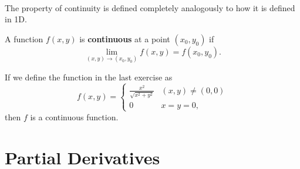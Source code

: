 \documentclass[../multivariate_calculus.tex]{subfiles}
\begin{document}
        \paragraph{}
        The property of continuity is defined completely analogously to how it is defined in 1D.
        \begin{definition}
            A function $f(x,y)$ is \textbf{continuous} at a point $(x_0,y_0)$ if
            \begin{equation}
                \lim_{(x,y)\to(x_0,y_0)}f(x,y)=f(x_0,y_0).
            \end{equation}
        \end{definition}
        \begin{example}
            If we define the function in the last exercise as
            \begin{equation}
                f(x,y)=\begin{cases}
                    \frac{x^2}{\sqrt{x^2+y^2}} & (x,y)\neq(0,0)\\
                    0 & x=y=0,
                \end{cases}
            \end{equation}
            then $f$ is a continuous function.
        \end{example}

    \section{Partial Derivatives}
\end{document}
